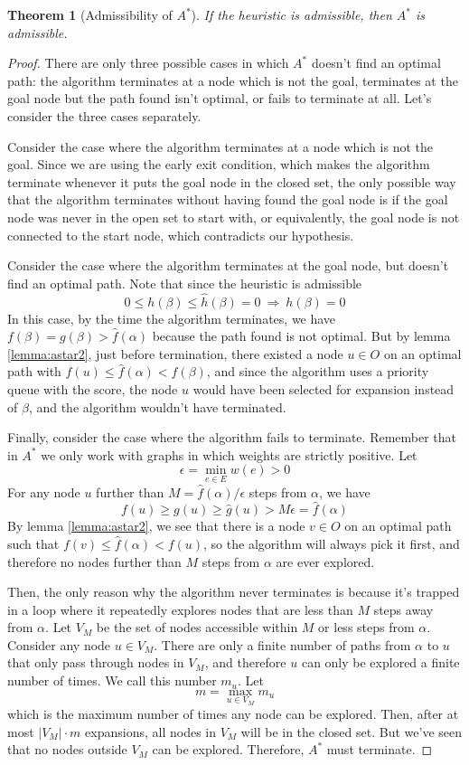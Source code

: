 \documentclass[12pt]{report}
\newtheorem{theorem}{Theorem}[chapter]
\begin{document}
\begin{theorem}[Admissibility of $A^*$]
\label{thm:astar}
If the heuristic is admissible, then $A^*$ is admissible.
\end{theorem}
\begin{proof}
There are only three possible cases in which $A^*$ doesn't find an optimal path: the algorithm terminates at a node which is not the goal, terminates at the goal node but the path found isn't optimal, or fails to terminate at all. Let's consider the three cases separately.

Consider the case where the algorithm terminates at a node which is not the goal. Since we are using the early exit condition, which makes the algorithm terminate whenever it puts the goal node in the closed set, the only possible way that the algorithm terminates without having found the goal node is if the goal node was never in the open set to start with, or equivalently, the goal node is not connected to the start node, which contradicts our hypothesis.

Consider the case where the algorithm terminates at the goal node, but doesn't find an optimal path. Note that since the heuristic is admissible
\[ 0 \leq h(\beta) \leq \hat{h}(\beta) = 0 \  \Rightarrow \  h(\beta) = 0 \]
In this case, by the time the algorithm terminates, we have $f(\beta) = g(\beta) > \hat{f}(\alpha)$ because the path found is not optimal. But by lemma \ref{lemma:astar2}, just before termination, there existed a node $u \in O$ on an optimal path with $f(u) \leq \hat{f}(\alpha) < f(\beta)$, and since the algorithm uses a priority queue with the score, the node $u$ would have been selected for expansion instead of $\beta$, and the algorithm wouldn't have terminated.

Finally, consider the case where the algorithm fails to terminate. Remember that in $A^*$ we only work with graphs in which weights are strictly positive. Let 
\[ \epsilon = \min_{e \in E} w(e) > 0 \]
For any node $u$ further than $M = \hat{f}(\alpha) / \epsilon$ steps from $\alpha$, we have
\[ f(u) \geq g(u) \geq \hat{g}(u) > M \epsilon = \hat{f}(\alpha) \]
By lemma \ref{lemma:astar2}, we see that there is a node $v \in O$ on an optimal path such that $f(v) \leq \hat{f}(\alpha) < f(u)$, so the algorithm will always pick it first, and therefore no nodes further than $M$ steps from $\alpha$ are ever explored.

Then, the only reason why the algorithm never terminates is because it's trapped in a loop where it repeatedly explores nodes that are less than $M$ steps away from $\alpha$. Let $V_M$ be the set of nodes accessible within $M$ or less steps from $\alpha$. Consider any node $u \in V_M$. There are only a finite number of paths from $\alpha$ to $u$ that only pass through nodes in $V_M$, and therefore $u$ can only be explored a finite number of times. We call this number $m_u$. Let
\[ m = \max_{u \in V_M} m_u \]
which is the maximum number of times any node can be explored. Then, after at most $|V_M| \cdot m$ expansions, all nodes in $V_M$ will be in the closed set. But we've seen that no nodes outside $V_M$ can be explored. Therefore, $A^*$ must terminate.
\end{proof}
\end{document}
